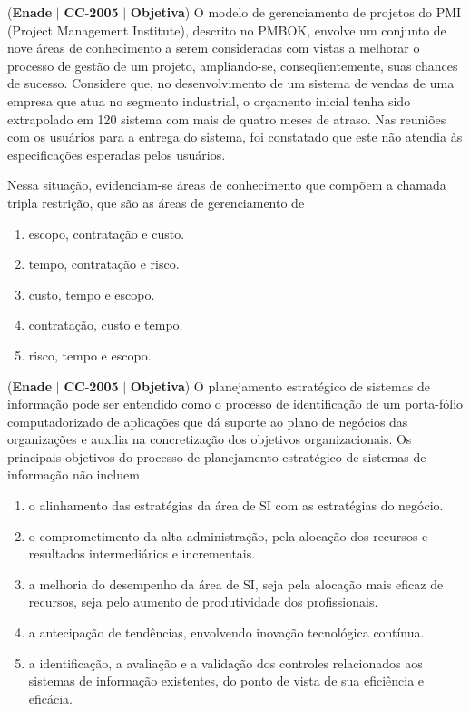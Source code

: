 \documentclass{exam}
\begin{document}
\begin{questions}
\question (\textbf{Enade} $|$ \textbf{CC}-\textbf{2005} $|$ \textbf{Objetiva})
O modelo de gerenciamento de projetos do PMI
(Project Management Institute), descrito no PMBOK, envolve
um conjunto de nove áreas de conhecimento a serem
consideradas com vistas a melhorar o processo de gestão de
um projeto, ampliando-se, conseqüentemente, suas chances
de sucesso. Considere que, no desenvolvimento de um
sistema de vendas de uma empresa que atua no segmento
industrial, o orçamento inicial tenha sido extrapolado em
120%
sistema com mais de quatro meses de atraso. Nas reuniões
com os usuários para a entrega do sistema, foi constatado que
este não atendia às especificações esperadas pelos usuários.

Nessa situação, evidenciam-se áreas de conhecimento que
compõem a chamada tripla restrição, que são as áreas de
gerenciamento de
	\begin{enumerate}[label=\alph*)]
		\item  escopo, contratação e custo.
		\item  tempo, contratação e risco.
		\item  custo, tempo e escopo.
		\item  contratação, custo e tempo.
		\item  risco, tempo e escopo.
	\end{enumerate}

\question (\textbf{Enade} $|$ \textbf{CC}-\textbf{2005} $|$ \textbf{Objetiva})
O planejamento estratégico de sistemas de informação pode ser
entendido como o processo de identificação de um porta-fólio
computadorizado de aplicações que dá suporte ao plano de
negócios das organizações e auxilia na concretização dos objetivos
organizacionais. Os principais objetivos do processo de
planejamento estratégico de sistemas de informação não incluem
	\begin{enumerate}[label=\alph*)]
		\item  o alinhamento das estratégias da área de SI com as estratégias
do negócio.
		\item  o comprometimento da alta administração, pela alocação dos
recursos e resultados intermediários e incrementais.
		\item  a melhoria do desempenho da área de SI, seja pela alocação
mais eficaz de recursos, seja pelo aumento de produtividade
dos profissionais.
		\item  a antecipação de tendências, envolvendo inovação tecnológica
contínua.
		\item  a identificação, a avaliação e a validação dos controles
relacionados aos sistemas de informação existentes, do ponto
de vista de sua eficiência e eficácia.
	\end{enumerate}


\end{questions}
\end{document}
